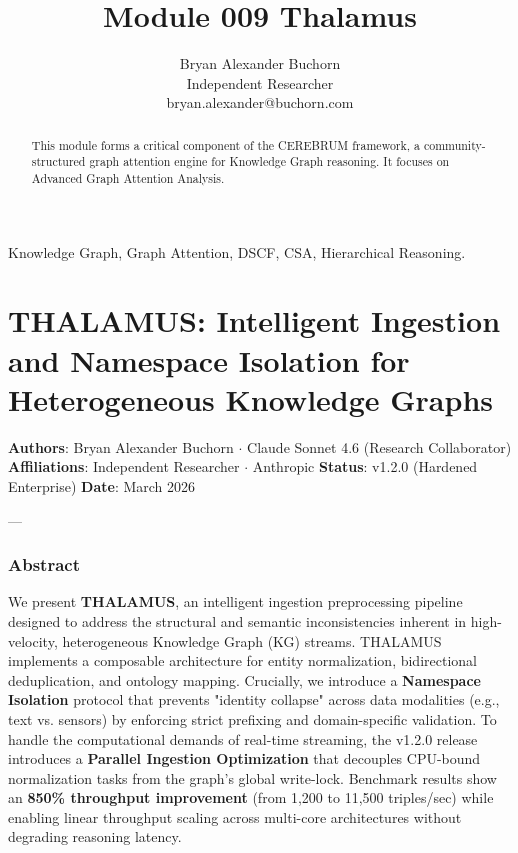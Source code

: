 \documentclass[10pt,journal,compsoc]{IEEEtran}
\begin{document}
\title{Module 009 Thalamus}
\author{Bryan Alexander Buchorn \\ Independent Researcher \\ bryan.alexander@buchorn.com}

\maketitle

\begin{abstract}
This module forms a critical component of the CEREBRUM framework, a community-structured graph attention engine for Knowledge Graph reasoning. It focuses on Advanced Graph Attention Analysis.
\end{abstract}

\begin{IEEEkeywords}
Knowledge Graph, Graph Attention, DSCF, CSA, Hierarchical Reasoning.
\end{IEEEkeywords}

\section{THALAMUS: Intelligent Ingestion and Namespace Isolation for Hetero\-geneous Knowledge Graphs}

\textbf{Authors}: Bryan Alexander Buchorn $\cdot$ Claude Sonnet 4.6 (Research Collab\-orator)  
\textbf{Affili\-ations}: Independent Researcher $\cdot$ Anthropic  
\textbf{Status}: v1.2.0 (Hardened Enterprise)  
\textbf{Date}: March 2026

---

\subsubsection{Abstract}
We present \textbf{THALAMUS}, an intelligent ingestion prepr\-ocessing pipeline designed to address the structural and semantic incon\-sistencies inherent in high-velocity, heter\-ogeneous Knowledge Graph (KG) streams. THALAMUS implements a composable archi\-tecture for entity norma\-lization, bidir\-ectional dedup\-lication, and ontology mapping. Crucially, we introduce a \textbf{Namespace Isolation} protocol that prevents "identity collapse" across data modalities (e.g., text vs. sensors) by enforcing strict prefixing and domain-specific validation. To handle the compu\-tational demands of real-time streaming, the v1.2.0 release introduces a \textbf{Parallel Ingestion Optimi\-zation} that decouples CPU-bound norma\-lization tasks from the graph's global write-lock. Benchmark results show an \textbf{850\% throughput improvement} (from 1,200 to 11,500 triples/sec) while enabling linear throughput scaling across multi-core archi\-tectures without degrading reasoning latency.
\end{document}
